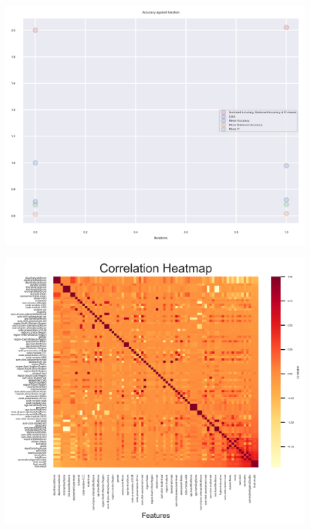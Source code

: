 \documentclass[11pt, a4paper, twocolumn]{article}
\begin{document}
\begin{figure}[h]
	\includegraphics[width=0.99\linewidth]{Accuracy_against_iteration2.png} 
	\label{fig:Acc2}
	\caption{}
\end{figure}

\begin{figure}[b]
	\includegraphics[width=2\linewidth]{heatmap.png} 
	\label{fig:heatmap}
\end{figure}
\end{document}
